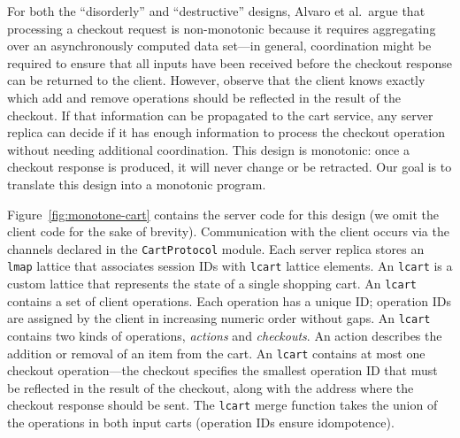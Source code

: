 For both the ``disorderly'' and ``destructive'' designs, Alvaro et al.\ argue
that processing a checkout request is non-monotonic because it requires
aggregating over an asynchronously computed data set---in general, coordination
might be required to ensure that all inputs have been received before the
checkout response can be returned to the client. However, observe that the
client knows exactly which add and remove operations should be reflected in the
result of the checkout. If that information can be propagated to the cart
service, any server replica can decide if it has enough information to process
the checkout operation without needing additional coordination. This design is
monotonic: once a checkout response is produced, it will never change or be
retracted. Our goal is to translate this design into a monotonic \lang program.


Figure~\ref{fig:monotone-cart} contains the server code for this design (we omit
the client code for the sake of brevity). Communication with the client occurs
via the channels declared in the \texttt{CartProtocol} module. Each server
replica stores an \texttt{lmap} lattice that associates session IDs with
\texttt{lcart} lattice elements. An \texttt{lcart} is a custom lattice that
represents the state of a single shopping cart. An \texttt{lcart} contains a set
of client operations. Each operation has a unique ID; operation IDs are assigned
by the client in increasing numeric order without gaps. An \texttt{lcart}
contains two kinds of operations, \emph{actions} and \emph{checkouts}. An action
describes the addition or removal of an item from the cart. An \texttt{lcart}
contains at most one checkout operation---the checkout specifies the smallest
operation ID that must be reflected in the result of the checkout, along with
the address where the checkout response should be sent. The \texttt{lcart} merge
function takes the union of the operations in both input carts (operation IDs
ensure idompotence).

